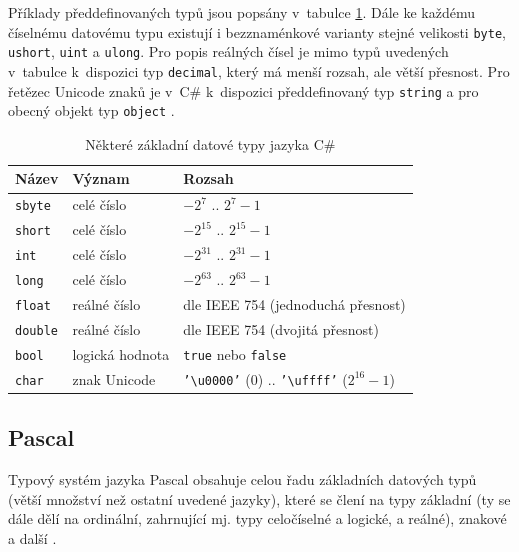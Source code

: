 \documentclass[onepage, a4paper, 12pt]{bakalarka}
\begin{document}
Příklady předdefinovaných typů jsou popsány v~tabulce \ref{table:cs-types}. Dále ke každému číselnému datovému typu existují i bezznaménkové varianty stejné velikosti \texttt{byte}, \texttt{ushort}, \texttt{uint} a \texttt{ulong}. Pro popis reálných čísel je mimo typů uvedených v~tabulce k~dispozici typ \texttt{decimal}, který má menší rozsah, ale větší přesnost. Pro řetězec Unicode znaků je v~C\# k~dispozici předdefinovaný typ \texttt{string} a pro obecný objekt typ \texttt{object} \cite{cs-book, cs-guide-types, cs-guide-byte, cs-guide-ushort, cs-guide-uint, cs-guide-ulong, cs-guide-decimal, cs-guide-string, cs-guide-object}.

\begin{table}\centering
\caption{Některé základní datové typy jazyka C\#}
\begin{tabular}{| l | l | l |}
\hline
\textbf{Název} & \textbf{Význam} & \textbf{Rozsah} \\ \hline
\texttt{sbyte} & celé číslo & $-2^7$ .. $2^7-1$ \\ \hline
\texttt{short} & celé číslo & $-2^{15}$ .. $2^{15}-1$ \\ \hline
\texttt{int} & celé číslo & $-2^{31}$ .. $2^{31}-1$ \\ \hline
\texttt{long} & celé číslo & $-2^{63}$ .. $2^{63}-1$ \\ \hline
\texttt{float} & reálné číslo & dle IEEE 754 (jednoduchá přesnost) \\ \hline
\texttt{double} & reálné číslo & dle IEEE 754 (dvojitá přesnost) \\ \hline
\texttt{bool} & logická hodnota & \texttt{true} nebo \texttt{false} \\ \hline
\texttt{char} & znak Unicode & \texttt{'\textbackslash u0000'} ($0$) .. \texttt{'\textbackslash uffff'} ($2^{16} - 1$) \\ \hline
\end{tabular}
\label{table:cs-types}
\end{table}

\subsection{Pascal}
Typový systém jazyka Pascal obsahuje celou řadu základních datových typů (větší množství než ostatní uvedené jazyky), které se člení na typy základní (ty se dále dělí na ordinální, zahrnující mj. typy celočíselné a logické, a reálné), znakové a další \cite{pas-guide-types, pas-guide-base-types, pas-guide-character-types}.
\end{document}
